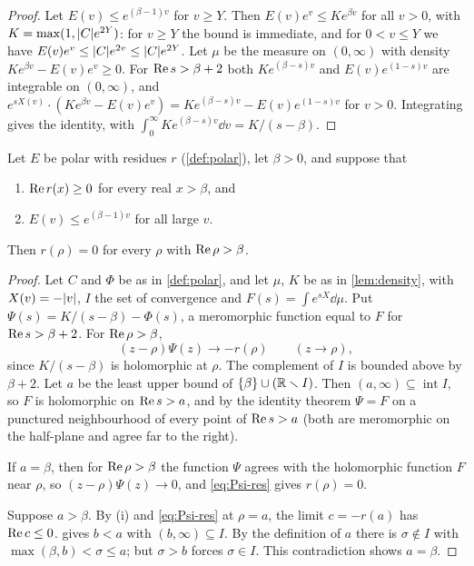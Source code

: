\begin{proof}
Let $E(v)\le e^{(\beta-1)v}$ for $v\ge Y$. Then $E(v)e^v\le Ke^{\beta v}$ for all $v>0$, with
$K=\max(1,\lvert C\rvert e^{2Y})$: for $v\ge Y$ the bound is immediate, and for $0<v\le Y$ we have
$E(v)e^v\le\lvert C\rvert e^{2v}\le\lvert C\rvert e^{2Y}$. Let $\mu$ be the measure on $(0,\infty)$ with density
$Ke^{\beta v}-E(v)e^v\ge0$. For $\operatorname{Re} s>\beta+2$ both $Ke^{(\beta-s)v}$ and $E(v)e^{(1-s)v}$ are
integrable on $(0,\infty)$, and $e^{sX(v)}\cdot(Ke^{\beta v}-E(v)e^v)=Ke^{(\beta-s)v}-E(v)e^{(1-s)v}$
for $v>0$. Integrating gives the identity, with $\int_0^\infty Ke^{(\beta-s)v}\dd v=K/(s-\beta)$.
\end{proof}

\begin{proposition}\label{prop:no-pole}
Let $E$ be polar with residues $r$ (\cref{def:polar}), let $\beta>0$, and suppose that
\begin{enumerate}[label=\textup{(\roman*)}]
\item $\operatorname{Re} r(x)\ge0$ for every real $x>\beta$, and
\item $E(v)\le e^{(\beta-1)v}$ for all large $v$.
\end{enumerate}
Then $r(\rho)=0$ for every $\rho$ with $\operatorname{Re}\rho>\beta$.
\end{proposition}

\begin{proof}
Let $C$ and $\Phi$ be as in \cref{def:polar}, and let $\mu$, $K$ be as in \cref{lem:density}, with
$X(v)=-\lvert v\rvert$, $I$ the set of convergence and $F(s)=\int e^{sX}\dd\mu$. Put
$\Psi(s)=K/(s-\beta)-\Phi(s)$, a meromorphic function equal to $F$ for $\operatorname{Re} s>\beta+2$. For
$\operatorname{Re}\rho>\beta$,
\begin{equation}\label{eq:Psi-res}
  (z-\rho)\Psi(z)\to-r(\rho)\qquad(z\to\rho),
\end{equation}
since $K/(s-\beta)$ is holomorphic at $\rho$. The complement of $I$ is bounded above by $\beta+2$.
Let $a$ be the least upper bound of $\{\beta\}\cup(\mathbb{R}\smallsetminus I)$. Then
$(a,\infty)\subseteq\operatorname{int}I$, so $F$ is holomorphic on $\operatorname{Re} s>a$, and by the identity
theorem $\Psi=F$ on a punctured neighbourhood of every point of $\operatorname{Re} s>a$ (both are meromorphic on
the half-plane and agree far to the right).

If $a=\beta$, then for $\operatorname{Re}\rho>\beta$ the function $\Psi$ agrees with the holomorphic function $F$
near $\rho$, so $(z-\rho)\Psi(z)\to0$, and \eqref{eq:Psi-res} gives $r(\rho)=0$.

Suppose $a>\beta$. By (i) and \eqref{eq:Psi-res} at $\rho=a$, the limit $c=-r(a)$ has
$\operatorname{Re} c\le0$.  gives $b<a$ with $(b,\infty)\subseteq I$. By the definition of
$a$ there is $\sigma\notin I$ with $\max(\beta,b)<\sigma\le a$; but $\sigma>b$ forces $\sigma\in I$.
This contradiction shows $a=\beta$.
\end{proof}

